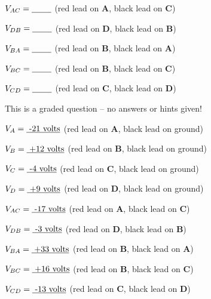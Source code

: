 \vskip 20pt

$V_{AC} = \hbox{\underbar{ \hskip 20pt}}$ (red lead on {\bf A}, black lead on {\bf C})

\vskip 5pt

$V_{DB} = \hbox{\underbar{ \hskip 20pt}}$ (red lead on {\bf D}, black lead on {\bf B})

\vskip 5pt

$V_{BA} = \hbox{\underbar{ \hskip 20pt}}$ (red lead on {\bf B}, black lead on {\bf A})

\vskip 5pt

$V_{BC} = \hbox{\underbar{ \hskip 20pt}}$ (red lead on {\bf B}, black lead on {\bf C})

\vskip 5pt

$V_{CD} = \hbox{\underbar{ \hskip 20pt}}$ (red lead on {\bf C}, black lead on {\bf D})

\vfil 

\eject






This is a graded question -- no answers or hints given!







$V_A = \hbox{\underbar{ -21 volts}}$ (red lead on {\bf A}, black lead on ground)

\vskip 5pt

$V_B = \hbox{\underbar{ +12 volts}}$ (red lead on {\bf B}, black lead on ground)

\vskip 5pt

$V_C = \hbox{\underbar{ -4 volts}}$ (red lead on {\bf C}, black lead on ground)

\vskip 5pt

$V_D = \hbox{\underbar{ +9 volts}}$ (red lead on {\bf D}, black lead on ground)

\vskip 20pt

\goodbreak

$V_{AC} = \hbox{\underbar{ -17 volts}}$ (red lead on {\bf A}, black lead on {\bf C})

\vskip 5pt

$V_{DB} = \hbox{\underbar{ -3 volts}}$ (red lead on {\bf D}, black lead on {\bf B})

\vskip 5pt

$V_{BA} = \hbox{\underbar{ +33 volts}}$ (red lead on {\bf B}, black lead on {\bf A})

\vskip 5pt

$V_{BC} = \hbox{\underbar{ +16 volts}}$ (red lead on {\bf B}, black lead on {\bf C})

\vskip 5pt

$V_{CD} = \hbox{\underbar{ -13 volts}}$ (red lead on {\bf C}, black lead on {\bf D})






